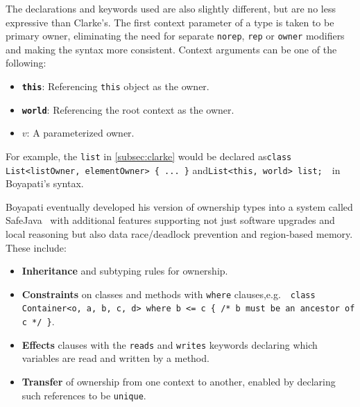 \documentclass{acm_proc_article-sp}
\begin{document}
The declarations and keywords used are also slightly different, but are no less
expressive than Clarke's. The first context parameter of a type is taken to be
primary owner, eliminating the need for separate \lstinline|norep|,
\lstinline|rep| or \lstinline|owner| modifiers and making the syntax more
consistent. Context arguments can be one of the following: \vspace{-0.5ex}
\begin{itemize}
	\setlength\itemsep{-0.2ex}
	\item \textbf{\lstinline|this|}:
		Referencing \lstinline|this| object as the owner.
	\item \textbf{\lstinline|world|}:
		Referencing the root context as the owner.
	\item \textbf{$v$}:
		A parameterized owner.
\end{itemize} \vspace{-0.5ex}

For example, the \lstinline|list| in \cref{subsec:clarke} would be declared
as\linebreak\lstinline|class List<listOwner, elementOwner> { ... }|
and\linebreak\lstinline|List<this, world> list;|~~in Boyapati's syntax.

Boyapati eventually developed his version of ownership types into a system
called SafeJava~\cite{boyapati04safejava} with additional features supporting
not just software upgrades and local reasoning but also data race/deadlock
prevention and region-based memory. These include: \vspace{-0.5ex}
\begin{itemize}
	\setlength\itemsep{-0.2ex}
	\item \textbf{Inheritance} and subtyping rules for ownership.
	\item \textbf{Constraints} on classes and methods with \lstinline|where|
clauses,\linebreak e.g.~~\lstinline|class Container<o, a, b, c, d> where b <= c { /* b must be an ancestor of c */ }|.
	\item \textbf{Effects} clauses with the \lstinline|reads| and
\lstinline|writes| keywords declaring which variables are read and written by a
method.
	\item \textbf{Transfer} of ownership from one context to another, enabled by
declaring such references to be \lstinline|unique|.
\end{itemize} \vspace{-0.5ex}
\end{document}

